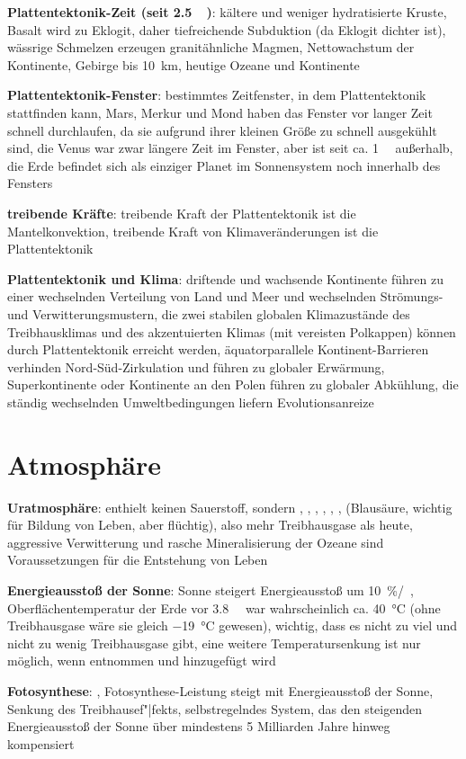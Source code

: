 \textbf{Plattentektonik-Zeit (seit \SI{2.5}{\giga\year})}:
kältere und weniger hydratisierte Kruste,
Basalt wird zu Eklogit, daher tiefreichende Subduktion (da Eklogit dichter ist),
wässrige Schmelzen erzeugen granitähnliche Magmen,
Nettowachstum der Kontinente,
Gebirge bis \SI{10}{\kilo\meter},
heutige Ozeane und Kontinente

\textbf{Plattentektonik-Fenster}:
bestimmtes Zeitfenster, in dem Plattentektonik stattfinden kann,
Mars, Merkur und Mond haben das Fenster vor langer Zeit schnell durchlaufen,
da sie aufgrund ihrer kleinen Größe zu schnell ausgekühlt sind,
die Venus war zwar längere Zeit im Fenster, aber ist seit ca. \SI{1}{\giga\year} außerhalb,
die Erde befindet sich als einziger Planet im Sonnensystem noch innerhalb des Fensters

\textbf{treibende Kräfte}:
treibende Kraft der Plattentektonik ist die Mantelkonvektion,
treibende Kraft von Klimaveränderungen ist die Plattentektonik

\textbf{Plattentektonik und Klima}:
driftende und wachsende Kontinente führen zu einer wechselnden Verteilung von Land und Meer und
wechselnden Strömungs- und Verwitterungsmustern,
die zwei stabilen globalen Klimazustände des Treibhausklimas und des akzentuierten Klimas
(mit vereisten Polkappen) können durch Plattentektonik erreicht werden,
äquatorparallele Kontinent-Barrieren verhinden Nord-Süd-Zirkulation und führen zu globaler
Erwärmung,
Superkontinente oder Kontinente an den Polen führen zu globaler Abkühlung,
die ständig wechselnden Umweltbedingungen liefern Evolutionsanreize

\section{%
    Atmosphäre%
}

\textbf{Uratmosphäre}:
enthielt keinen Sauerstoff, sondern , , , , ,
,  (Blausäure, wichtig für Bildung von Leben, aber flüchtig),
also mehr Treibhausgase als heute,
aggressive Verwitterung und rasche Mineralisierung der Ozeane sind Voraussetzungen für die
Entstehung von Leben

\textbf{Energieausstoß der Sonne}:
Sonne steigert Energieausstoß um \SI{10}{\percent/\giga\year},
Oberflächentemperatur der Erde vor \SI{3.8}{\giga\year} war wahrscheinlich ca.
\SI{40}{\celsius} (ohne Treibhausgase wäre sie gleich \SI{-19}{\celsius} gewesen),
wichtig, dass es nicht zu viel und nicht zu wenig Treibhausgase gibt,
eine weitere Temperatursenkung ist nur möglich, wenn  entnommen und 
hinzugefügt wird

\textbf{Fotosynthese}:
,
Fotosynthese-Leistung steigt mit Energieausstoß der Sonne,
Senkung des Treibhausef"|fekts,
selbstregelndes System, das den steigenden Energieausstoß der Sonne über mindestens
5 Milliarden Jahre hinweg kompensiert

\pagebreak

